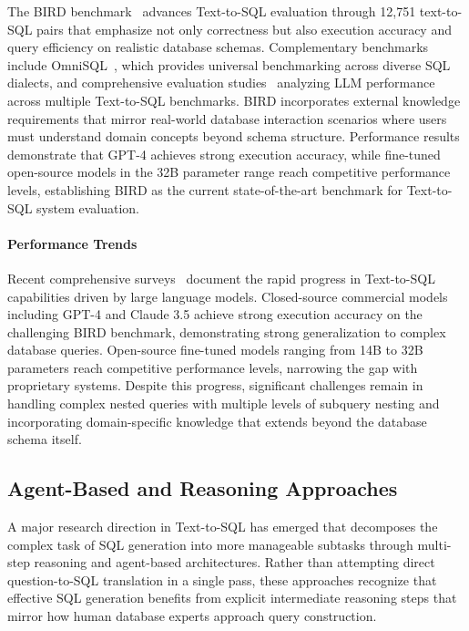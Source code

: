 The BIRD benchmark~\cite{bird} advances Text-to-SQL evaluation through 12,751 text-to-SQL pairs that emphasize not only correctness but also execution accuracy and query efficiency on realistic database schemas. Complementary benchmarks include OmniSQL~\cite{omnisql}, which provides universal benchmarking across diverse SQL dialects, and comprehensive evaluation studies~\cite{gao2024text} analyzing LLM performance across multiple Text-to-SQL benchmarks. BIRD incorporates external knowledge requirements that mirror real-world database interaction scenarios where users must understand domain concepts beyond schema structure. Performance results demonstrate that GPT-4 achieves strong execution accuracy, while fine-tuned open-source models in the 32B parameter range reach competitive performance levels, establishing BIRD as the current state-of-the-art benchmark for Text-to-SQL system evaluation.

\paragraph{Performance Trends}

Recent comprehensive surveys~\cite{survey_llm_t2sql_liu2025,survey_llm_t2sql_huang2025} document the rapid progress in Text-to-SQL capabilities driven by large language models. Closed-source commercial models including GPT-4 and Claude 3.5 achieve strong execution accuracy on the challenging BIRD benchmark, demonstrating strong generalization to complex database queries. Open-source fine-tuned models ranging from 14B to 32B parameters reach competitive performance levels, narrowing the gap with proprietary systems. Despite this progress, significant challenges remain in handling complex nested queries with multiple levels of subquery nesting and incorporating domain-specific knowledge that extends beyond the database schema itself.

\subsection{Agent-Based and Reasoning Approaches}

A major research direction in Text-to-SQL has emerged that decomposes the complex task of SQL generation into more manageable subtasks through multi-step reasoning and agent-based architectures. Rather than attempting direct question-to-SQL translation in a single pass, these approaches recognize that effective SQL generation benefits from explicit intermediate reasoning steps that mirror how human database experts approach query construction.

